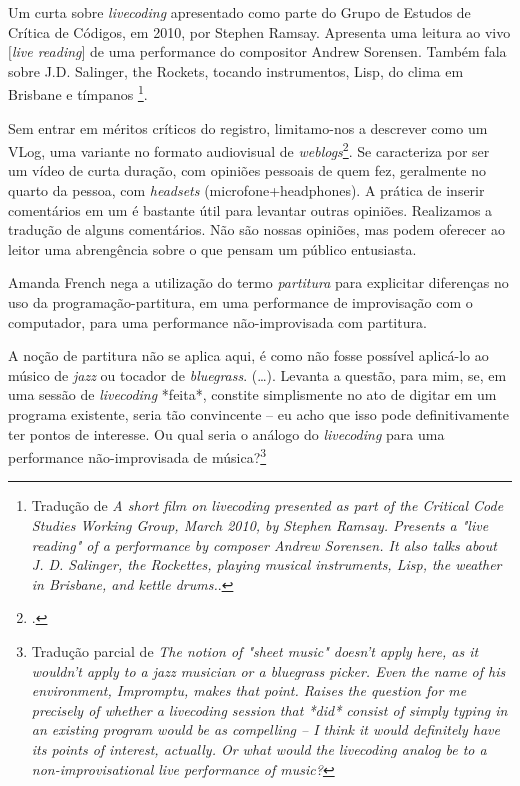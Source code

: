 \begin{citacao}
Um curta sobre \emph{livecoding} apresentado como parte do Grupo de Estudos de Crítica de Códigos, em 2010, por Stephen Ramsay. Apresenta uma leitura ao vivo $[$\emph{live reading}$]$ de uma performance do compositor Andrew Sorensen. Também fala sobre J.D. Salinger, the Rockets, tocando instrumentos, Lisp, do clima em Brisbane e tímpanos \footnote{ Tradução de \emph{A short film on livecoding presented as part of the Critical Code Studies Working Group, March 2010, by Stephen Ramsay. Presents a "live reading" of a performance by composer Andrew Sorensen. It also talks about J. D. Salinger, the Rockettes, playing musical instruments, Lisp, the weather in Brisbane, and kettle drums.}.}.
\end{citacao}

Sem entrar em méritos críticos do registro, limitamo-nos a descrever como um VLog, uma variante no formato audiovisual de \emph{weblogs}\footnote{.}. Se caracteriza por ser um vídeo de curta duração, com opiniões pessoais de quem fez, geralmente no quarto da pessoa, com \emph{headsets} (microfone+headphones). A prática de inserir comentários em um é bastante útil para levantar outras opiniões. Realizamos a tradução de alguns comentários. Não são nossas opiniões, mas podem oferecer ao leitor uma abrengência sobre o que pensam um público entusiasta.

Amanda French nega a utilização do termo \emph{partitura} para explicitar diferenças no uso da programação-partitura, em uma performance de improvisação com o computador, para uma performance não-improvisada com partitura.

\begin{citacao}
A noção de partitura não se aplica aqui, é como não fosse possível aplicá-lo ao músico de \emph{jazz} ou tocador de \emph{bluegrass}. (\ldots). Levanta a questão, para mim, se, em uma sessão de \emph{livecoding} *feita*, constite simplismente no ato de digitar em um programa existente, seria tão convincente -- eu acho que isso pode definitivamente ter pontos de interesse. Ou qual seria o análogo do \emph{livecoding} para uma performance não-improvisada de música?\footnote{ Tradução parcial de \emph{The notion of "sheet music" doesn't apply here, as it wouldn't apply to a jazz musician or a bluegrass picker. Even the name of his environment, Impromptu, makes that point. Raises the question for me precisely of whether a livecoding session that *did* consist of simply typing in an existing program would be as compelling -- I think it would definitely have its points of interest, actually. Or what would the livecoding analog be to a non-improvisational live performance of music?}}
\end{citacao}

